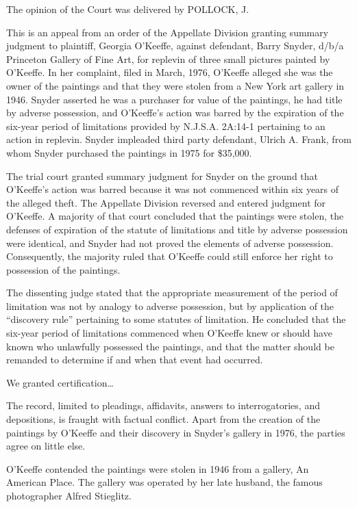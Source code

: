 
The opinion of the Court was delivered by POLLOCK, J.

This is an appeal from an order of the Appellate Division granting summary
judgment to plaintiff, Georgia O'Keeffe, against defendant, Barry Snyder, d/b/a
Princeton Gallery of Fine Art, for replevin of three small pictures painted by
O'Keeffe. In her complaint, filed in March, 1976, O'Keeffe alleged she was the
owner of the paintings and that they were stolen from a New York art gallery in
1946. Snyder asserted he was a purchaser for value of the paintings, he had
title by adverse possession, and O'Keeffe's action was barred by the expiration
of the six-year period of limitations provided by N.J.S.A. 2A:14-1 pertaining
to an action in replevin. Snyder impleaded third party defendant, Ulrich A.
Frank, from whom Snyder purchased the paintings in 1975 for \$35,000. 

The trial court granted summary judgment for Snyder on the ground that
O'Keeffe's action was barred because it was not commenced within six years of
the alleged theft. The Appellate Division reversed and entered judgment for
O'Keeffe. A majority of that court concluded that the paintings were stolen,
the defenses of expiration of the statute of limitations and title by adverse
possession were identical, and Snyder had not proved the elements of adverse
possession. Consequently, the majority ruled that O'Keeffe could still enforce
her right to possession of the paintings. 

The dissenting judge stated that the appropriate measurement of the period of
limitation was not by analogy to adverse possession, but by application of the
``discovery rule'' pertaining to some statutes of limitation. He concluded that
the six-year period of limitations commenced when O'Keeffe knew or should have
known who unlawfully possessed the paintings, and that the matter should be
remanded to determine if and when that event had occurred.

We granted certification\ldots


The record, limited to pleadings, affidavits, answers to interrogatories, and
depositions, is fraught with factual conflict. Apart from the creation of the
paintings by O'Keeffe and their discovery in Snyder's gallery in 1976, the
parties agree on little else.

O'Keeffe contended the paintings were stolen in 1946 from a gallery, An American
Place. The gallery was operated by her late husband, the famous photographer
Alfred Stieglitz.

